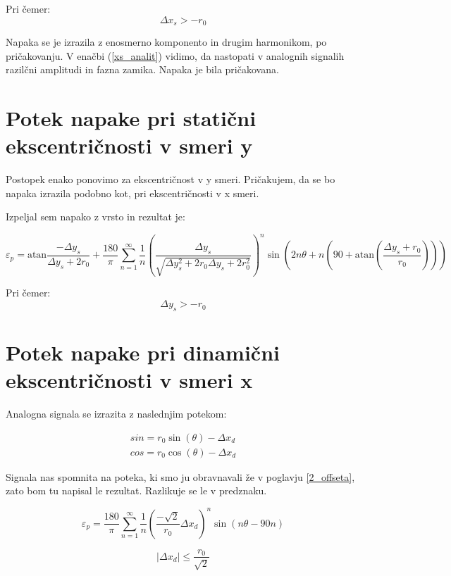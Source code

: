  Pri čemer:
 $$\Delta x_s > -r_0$$
 
 Napaka se je izrazila z enosmerno komponento in drugim harmonikom, po pričakovanju. V enačbi (\ref{xs_analit}) vidimo, da nastopati v analognih signalih razilčni amplitudi in fazna zamika. Napaka  je bila pričakovana.
 
 
 
 \section{Potek napake pri statični ekscentričnosti v smeri y}
 
 Postopek enako ponovimo za ekscentričnost v y smeri. Pričakujem, da se bo napaka izrazila podobno kot, pri ekscentričnosti v x smeri.
 
 Izpeljal sem napako z vrsto in rezultat je: 
 
  \begin{equation}
   \label{vrsta:ys}
 \varepsilon_p = \mathrm{atan}\frac{-\Delta y _s}{\Delta y _s+2r_0}+\frac{180}{\pi} \sum_{n=1}^{\infty}\frac{1}{n} (\frac{\Delta y _s}{\sqrt{\Delta y _s^2+2 r_0 \Delta y _s+2r_0^2}})^n \sin (2n \theta+n (90+ \mathrm{ atan}(\frac{\Delta y _s+r_0}{r_0})))
 \end{equation}

 Pri čemer:
$$\Delta y_s > -r_0$$

\section{Potek napake pri dinamični ekscentričnosti v smeri x}

Analogna signala se izrazita z naslednjim potekom:

\begin{eqnarray}
sin = r_0 \sin(\theta) - \Delta x_d \\
cos = r_0 \cos(\theta) - \Delta x_d
\end{eqnarray}

Signala nas spomnita na poteka, ki smo ju obravnavali že v poglavju \ref{2_offseta}, zato bom tu napisal le rezultat. Razlikuje se le v predznaku.

\begin{equation}
\varepsilon_p=
\frac{180}{\pi}\sum_{n=1}^{\infty}\frac{1}{n}( \frac{-\sqrt{2}}{r_0}\Delta x_d)^n \sin (n \theta -  90 n)
\end{equation}


$$|\Delta x_d|\leq \frac{r_0}{\sqrt{2}}$$


